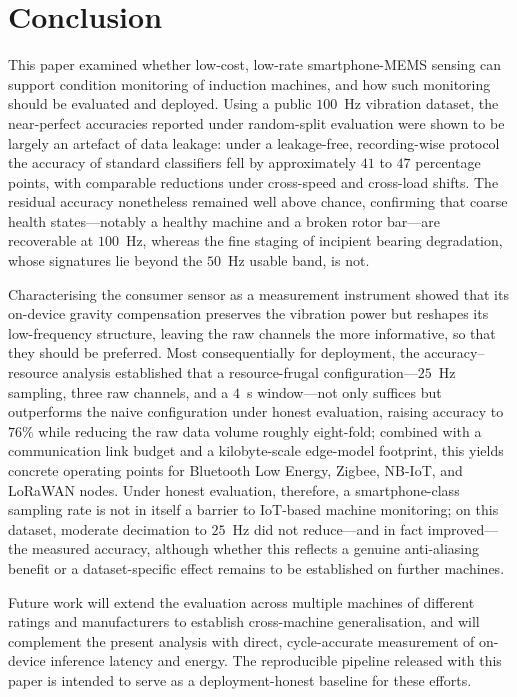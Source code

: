 
\section{Conclusion}
\label{sec:conclusion}

This paper examined whether low-cost, low-rate smartphone-MEMS sensing can support
condition monitoring of induction machines, and how such monitoring should be
evaluated and deployed. Using a public $100$~Hz vibration dataset, the near-perfect
accuracies reported under random-split evaluation were shown to be largely an
artefact of data leakage: under a leakage-free, recording-wise protocol the
accuracy of standard classifiers fell by approximately $41$ to $47$ percentage
points, with comparable reductions under cross-speed and cross-load shifts. The
residual accuracy nonetheless remained well above chance, confirming that coarse
health states---notably a healthy machine and a broken rotor bar---are recoverable
at $100$~Hz, whereas the fine staging of incipient bearing degradation, whose
signatures lie beyond the $50$~Hz usable band, is not.

Characterising the consumer sensor as a measurement instrument showed that its
on-device gravity compensation preserves the vibration power but reshapes its
low-frequency structure, leaving the raw channels the more informative, so that
they should be preferred. Most consequentially for
deployment, the accuracy--resource analysis established that a resource-frugal
configuration---$25$~Hz sampling, three raw channels, and a $4$~s window---not
only suffices but outperforms the naive configuration under honest evaluation,
raising accuracy to $76\%$ while reducing the raw data volume roughly eight-fold;
combined with a communication link budget and a kilobyte-scale edge-model
footprint, this yields concrete operating points for Bluetooth Low Energy,
Zigbee, NB-IoT, and LoRaWAN nodes. Under honest evaluation, therefore, a
smartphone-class sampling rate is not in itself a barrier to IoT-based machine
monitoring; on this dataset, moderate decimation to $25$~Hz did not reduce---and
in fact improved---the measured accuracy, although whether this reflects a
genuine anti-aliasing benefit or a dataset-specific effect remains to be
established on further machines.

Future work will extend the evaluation across multiple machines of different
ratings and manufacturers to establish cross-machine generalisation, and will
complement the present analysis with direct, cycle-accurate measurement of
on-device inference latency and energy. The reproducible pipeline released with
this paper is intended to serve as a deployment-honest baseline for these efforts.
